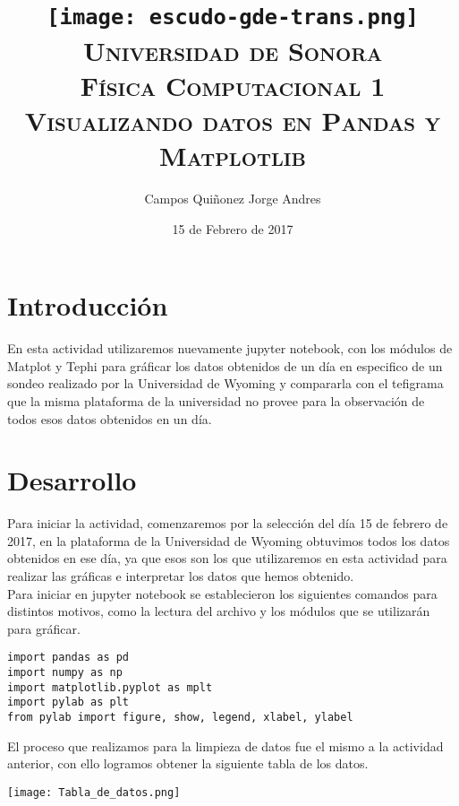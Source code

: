 \documentclass{article}
\begin{document}
\begin{doublespace}
\title{\texttt{[image: escudo-gde-trans.png]}\\ \textsc{\LARGE Universidad de Sonora\\Física Computacional 1\\Visualizando datos en Pandas y Matplotlib}}
\author{\huge Campos Quiñonez Jorge Andres}
\date{\Large 15 de Febrero de 2017}
\maketitle

\end{doublespace}

\newpage
\mbox{}
\thispagestyle{empty}
\newpage
\tableofcontents
\newpage
\section{\huge Introducción}
\large En esta actividad utilizaremos nuevamente jupyter notebook, con los módulos de Matplot y Tephi para gráficar los datos obtenidos de un día en especifico de un sondeo realizado por la Universidad de Wyoming y compararla con el tefigrama que la misma plataforma de la universidad no provee para la observación de todos esos datos obtenidos en un día.
\newpage
\section{\huge Desarrollo}
Para iniciar la actividad, comenzaremos por la selección del día 15 de febrero de 2017, en la plataforma de la Universidad de Wyoming obtuvimos todos los datos obtenidos en ese día, ya que esos son los que utilizaremos en esta actividad para realizar las gráficas e interpretar los datos que hemos obtenido.\\
Para iniciar en jupyter notebook se establecieron los siguientes comandos para distintos motivos, como la lectura del archivo y los módulos que se utilizarán para gráficar.
\begin{verbatim}
import pandas as pd
import numpy as np
import matplotlib.pyplot as mplt
import pylab as plt
from pylab import figure, show, legend, xlabel, ylabel
\end{verbatim}
El proceso que realizamos para la limpieza de datos fue el mismo a la actividad anterior, con ello logramos obtener la siguiente tabla de los datos.\\
\begin{center}
\texttt{[image: Tabla\_de\_datos.png]}
\end{center}
\newpage
\end{document}
